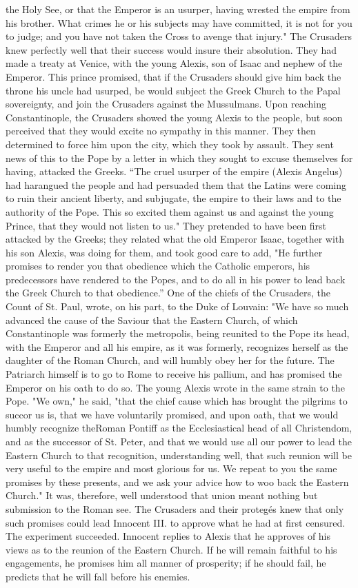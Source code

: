the Holy See, or that the Emperor is an usurper, having wrested the empire from his brother. What crimes he or his subjects may have committed, it is not for you to judge; and you have not taken the Cross to avenge that injury." The Crusaders knew perfectly well that their success would insure their absolution. They had made a treaty at Venice, with the young Alexis, son of Isaac and nephew of the Emperor. This prince promised, that if the Crusaders should give him back the throne his uncle had usurped, be would subject the Greek Church to the Papal sovereignty, and join the Crusaders against the Mussulmans. Upon reaching Constantinople, the Crusaders showed the young Alexis to the people, but soon perceived that they would excite no sympathy in this manner. They then determined to force him upon the city, which they took by assault. They sent news of this to the Pope by a letter in which they sought to excuse themselves for having, attacked the Greeks. “The cruel usurper of the empire (Alexis Angelus) had harangued the people and had persuaded them that the Latins were coming to ruin their ancient liberty, and subjugate, the empire to their laws and to the authority of the Pope. This so excited them against us and against the young Prince, that they would not listen to us." They pretended to have been first attacked by the Greeks; they related what the old Emperor Isaac, together with his son Alexis, was doing for them, and took good care to add, "He further promises to render you that obedience which the Catholic emperors, his predecessors have rendered to the Popes, and to do all in his power to lead back the Greek Church to that obedience.” One of the chiefs of the Crusaders, the Count of St. Paul, wrote, on his part, to the Duke of Louvain: "We have so much advanced the cause of the Saviour that the Eastern Church, of which Constantinople was formerly the metropolis, being reunited to the Pope its head, with the Emperor and all his empire, as it was formerly, recognizes herself as the daughter of the Roman Church, and will humbly obey her for the future. The Patriarch himself is to go to Rome to receive his pallium, and has promised the Emperor on his oath to do so. The young Alexis wrote in the same strain to the Pope. "We own," he said, "that the chief cause which has brought the pilgrims to succor us is, that we have voluntarily promised, and upon oath, that we would humbly recognize theRoman Pontiff as the Ecclesiastical head of all Christendom, and as the successor of St. Peter, and that we would use all our power to lead the Eastern Church to that recognition, understanding well, that such reunion will be very useful to the empire and most glorious for us. We repeat to you the same promises by these presents, and we ask your advice how to woo back the Eastern Church." It was, therefore, well understood that union meant nothing but submission to the Roman see. The Crusaders and their protegés knew that only such promises could lead Innocent III. to approve what he had at first censured. The experiment succeeded. Innocent replies to Alexis that he approves of his views as to the reunion of the Eastern Church. If he will remain faithful to his engagements, he promises him all manner of prosperity; if he should fail, he predicts that he will fall before his enemies. 